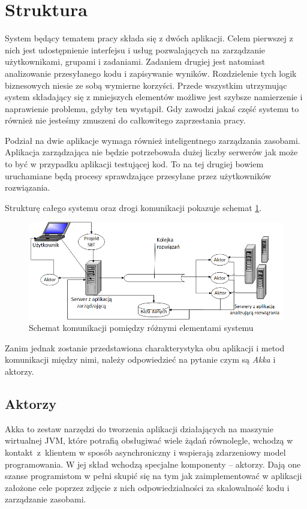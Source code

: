 \documentclass[wimgr]{xmgr}
\begin{document}
\section{Struktura}
\label{section:struktrura}
System będący tematem pracy składa się z dwóch aplikacji. Celem pierwszej z nich jest udostępnienie interfejsu i usług pozwalających na zarządzanie użytkownikami, grupami i zadaniami.
Zadaniem drugiej jest natomiast analizowanie przesyłanego kodu i zapisywanie wyników. Rozdzielenie tych logik biznesowych niesie ze sobą wymierne korzyści. Przede wszystkim utrzymując system składający się z mniejszych elementów możliwe jest szybsze namierzenie i naprawienie problemu, gdyby ten wystąpił. Gdy zawodzi jakaś część systemu to również nie jesteśmy zmuszeni do całkowitego zaprzestania pracy. 

Podział na dwie aplikacje wymaga również inteligentnego zarządzania zasobami. Aplikacja zarządzająca nie będzie potrzebowała dużej liczby serwerów jak może to być w przypadku aplikacji testującej kod. To na tej drugiej bowiem uruchamiane będą procesy sprawdzające przesyłane przez użytkowników rozwiązania.

Strukturę całego systemu oraz drogi komunikacji pokazuje schemat \ref{system:schemat}. 

\begin{figure}[!tbh]
\centering 
\includegraphics[width=1.05\hsize]{fig/scaxerciser_schemat}
\caption{Schemat komunikacji pomiędzy różnymi elementami systemu\label{system:schemat}}
\end{figure}

Zanim jednak zostanie przedstawiona charakterystyka obu aplikacji i metod komunikacji między nimi, należy odpowiedzieć na pytanie czym są \emph{Akka} i aktorzy.

\subsection{Aktorzy}

Akka to zestaw narzędzi do tworzenia aplikacji działających na maszynie wirtualnej JVM, które potrafią obsługiwać wiele żądań równolegle, wchodzą w kontakt~z~klientem w sposób asynchroniczny i wspierają zdarzeniowy model programowania. W jej skład wchodzą specjalne komponenty -- aktorzy. Dają one szanse programistom w pełni skupić się na tym jak zaimplementować w aplikacji założone cele poprzez zdjęcie z nich odpowiedzialności za skalowalność kodu i zarządzanie zasobami.   
\end{document}
